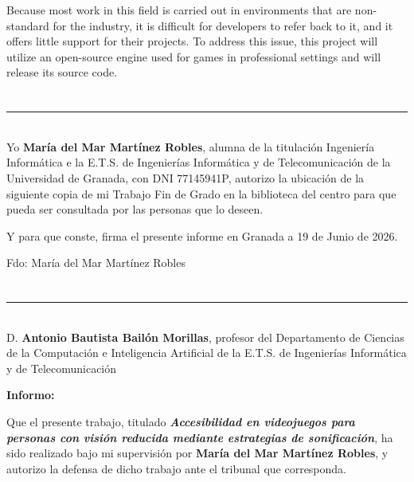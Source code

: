 Because most work in this field is carried out in environments that are non-standard for the industry, it is difficult for developers to refer back to it, and it offers little support for their projects. To address this issue, this project will utilize an open-source engine used for games in professional settings and will release its source code. \\
\newpage
\thispagestyle{empty}
\chapter*{}
\thispagestyle{empty}

\noindent\rule[-1ex]{\textwidth}{2pt}\\[4.5ex]

Yo \textbf{María del Mar Martínez Robles}, alumna de la titulación Ingeniería Informática e la E.T.S. de Ingenierías Informática y de Telecomunicación de la Universidad de Granada, con DNI 77145941P, autorizo la ubicación de la siguiente copia de mi Trabajo Fin de Grado en la biblioteca del centro para que pueda ser consultada por las personas que lo deseen.

\vspace{0.5cm}

Y para que conste, firma el presente informe en Granada a 19 de Junio de 2026.


\vspace{5cm}

\noindent Fdo: María del Mar Martínez Robles
\newpage
\thispagestyle{empty}
\chapter*{}

\thispagestyle{empty}

\noindent\rule[-1ex]{\textwidth}{2pt}\\[4.5ex]

D. \textbf{Antonio Bautista Bailón Morillas}, profesor del Departamento de Ciencias de la Computación e Inteligencia Artificial de la  E.T.S. de Ingenierías Informática y de Telecomunicación 

\vspace{0.5cm}

\textbf{Informo:}

\vspace{0.5cm}

Que el presente trabajo, titulado \textit{\textbf{Accesibilidad en videojuegos
para personas con visión reducida mediante estrategias de sonificación}},
ha sido realizado bajo mi supervisión por \textbf{María del Mar Martínez Robles}, y autorizo la defensa de dicho trabajo ante el tribunal
que corresponda.

